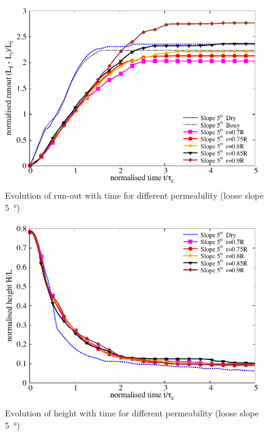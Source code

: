 \begin{figure}
\centering
\includegraphics[width=0.97\columnwidth]{Runout_loose_5}
\caption{Evolution of run-out with time for different permeability (loose slope \SI{5}{\degree})}
\label{fig:run5}
\end{figure}


\begin{figure}
\centering
\includegraphics[width=0.97\columnwidth]{Height_loose_5}
\caption{Evolution of height with time for different permeability (loose slope \SI{5}{\degree})}
\label{fig:height5}
\end{figure}

